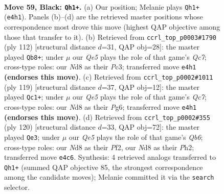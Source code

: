 \documentclass[11pt]{article}
\begin{document}
\clearpage

\begin{figure}[p]\centering
\begin{subfigure}{0.46\textwidth}\centering
\resizebox{\linewidth}{!}{%
\newchessgame
\chessboard[
  setfen={2kn2Q1/p1p3p1/1p4p1/2p5/4q3/2P5/1P6/K7 b - - 19 59},
  showmover=false,
  pgfstyle=straightmove, color=movearrow, markmove={e4-h1}
]}
\caption{}
\end{subfigure}\hfill
\begin{subfigure}{0.46\textwidth}\centering
\resizebox{\linewidth}{!}{%
\newchessgame
\chessboard[
  setfen={6k1/2Q2p2/6p1/8/p3PP2/2P4P/6PK/2q5 w - - 13 57},
  showmover=false,
  pgfstyle=straightmove, color=movearrow, markmove={c7-b8}
]}
\caption{}
\end{subfigure}
\\[4pt]
\begin{subfigure}{0.46\textwidth}\centering
\resizebox{\linewidth}{!}{%
\newchessgame
\chessboard[
  setfen={4Q3/8/3p2pk/1P1P2p1/5p2/7P/2q3P1/4K3 b - - 15 60},
  showmover=false,
  pgfstyle=straightmove, color=movearrow, markmove={c2-c1}
]}
\caption{}
\end{subfigure}\hfill
\begin{subfigure}{0.46\textwidth}\centering
\resizebox{\linewidth}{!}{%
\newchessgame
\chessboard[
  setfen={8/5pk1/1Q6/4p3/6p1/1P4Pp/P1K2P1P/6q1 w - - 23 61},
  showmover=false,
  pgfstyle=straightmove, color=movearrow, markmove={b6-e3}
]}
\caption{}
\end{subfigure}
\caption{\textbf{Move 59, Black: \texttt{Qh1+}.} (a) Our position; Melanie plays \texttt{Qh1+} (\texttt{e4h1}). Panels (b)--(d) are the retrieved master positions whose correspondence most drove this move (highest QAP objective among those that transfer to it). (b) Retrieved from \texttt{ccrl\_top\_p0003\#1790} (ply 112) [structural distance $d$=31, QAP obj=28]: the master played \texttt{Qb8+}; under $\mu$ our \emph{Qe5} plays the role of that game's \emph{Qc7}; cross-type roles: our \emph{N}d8 as their \emph{P}c3; transferred move \texttt{e4h1} \textbf{(endorses this move)}. (c) Retrieved from \texttt{ccrl\_top\_p0002\#1011} (ply 119) [structural distance $d$=37, QAP obj=12]: the master played \texttt{Qc1+}; under $\mu$ our \emph{Qe5} plays the role of that game's \emph{Qc7}; cross-type roles: our \emph{N}d8 as their \emph{P}g6; transferred move \texttt{e4h1} \textbf{(endorses this move)}. (d) Retrieved from \texttt{ccrl\_top\_p0002\#355} (ply 120) [structural distance $d$=33, QAP obj=72]: the master played \texttt{Qe3}; under $\mu$ our \emph{Qe5} plays the role of that game's \emph{Qb6}; cross-type roles: our \emph{N}d8 as their \emph{P}f2, our \emph{N}d8 as their \emph{P}h2; transferred move \texttt{e4c6}. Synthesis: 4 retrieved analogs transferred to \texttt{Qh1+} (summed QAP objective 85, the strongest correspondence among the candidate moves); Melanie committed it via the \texttt{search} selector.}
\label{fig:thought-m117}
\end{figure}
\end{document}

